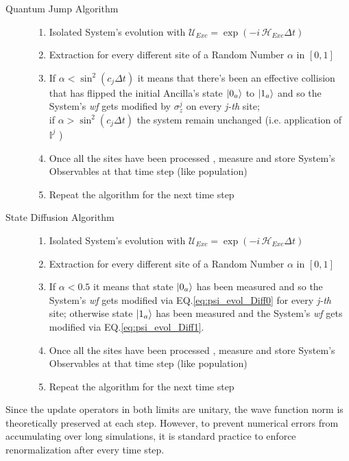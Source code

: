 \documentclass[a4paper,12pt]{article}
\begin{document}
	\begin{description}
		\item[Quantum Jump Algorithm] \leavevmode
		\begin{enumerate}
			\item Isolated System's evolution with $ \mathcal{U}_{Exc} = \exp{\left( -i \, \mathcal{H}_{Exc} \Delta t \right) }$
			\item Extraction for every different site of a Random Number $\alpha$ in $[0,1]$
			\item If $ \alpha < \sin^{2}{\left(c_j \Delta t\right)} $ it means that there's been an effective collision that has flipped the initial Ancilla's state $ \ket{0_a} $ to $ \ket{1_a} $ and so the System's \textit{wf} gets modified by $ \sigma_{z}^{j} $ on every \textit{j-th} site; \\
			if $ \alpha > \sin^{2}{\left(c_j \Delta t\right)} $ the system remain unchanged (i.e. application of $ \mathbb{I}^j $ )
			\item Once all the sites have been processed , measure and store System's Observables at that time step (like population)
			\item Repeat the algorithm for the next time step
		\end{enumerate}
		\item[State Diffusion Algorithm] \leavevmode
		\begin{enumerate}
			\item Isolated System's evolution with $ \mathcal{U}_{Exc} = \exp{\left( -i \, \mathcal{H}_{Exc} \Delta t \right) }$
			\item Extraction for every different site of a Random Number 	$\alpha$ in $[0,1]$
			\item If $ \alpha < 0.5 $ it means that state $ \ket{0_a} $ has been measured and so the System's \textit{wf} gets modified via EQ.\ref{eq:psi_evol_Diff0} for every \textit{j-th} site;
			otherwise state $ \ket{1_a} $ has been measured and the System's \textit{wf} gets modified via EQ.\ref{eq:psi_evol_Diff1}.
			\item Once all the sites have been processed , measure and store System's Observables at that time step (like population)
			\item Repeat the algorithm for the next time step
		\end{enumerate}
	\end{description}

	Since the update operators in both limits are unitary, the wave function norm is theoretically preserved at each step. However, to prevent numerical errors from accumulating over long simulations, it is standard practice to enforce renormalization after every time step.
\end{document}
